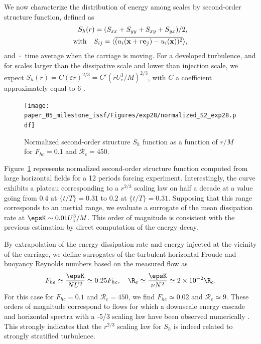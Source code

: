 \noindent We now characterize the distribution of energy among scales by second-order
structure function, defined as
\begin{eqnarray}
S_h(r) = (S_{xx} + S_{yy} + S_{xy} + S_{yx})/2,\\
\text{with} \quad S_{ij} = \langle\overline{(u_i({\bf x}+r{\bf e}_j)-u_i({\bf x}))^2}\rangle,
\end{eqnarray}
and $\overline{\cdot}$ time average when the carriage is moving. For a
developed turbulence, and for scales larger than the dissipative scale and
lower than injection scale, we expect
$S_h(r) = C (\varepsilon r)^{2/3} = C' (rU_c^3/M)^{2/3}$, with $C$ a coefficient
approximately equal to 6 \citep[see figure 15 in][]{AugierBillantChomaz2015}.
\begin{figure}[htb]
\centerline{
\texttt{[image: paper\_05\_milestone\_issf/Figures/exp28/normalized\_S2\_exp28.pdf]}}
\vspace{-2mm}
\caption{Normalized second-order structure $S_h$ function as a function of
$r/M$ for $F_{hc} = 0.1$ and $\mathcal{R}_c=450$.}
\label{fig:S2}
\end{figure}
Figure~\ref{fig:S2} represents normalized second-order structure function
computed from large horizontal fields for a 12 periods forcing
experiment. Interestingly, the curve exhibits a plateau corresponding to a
$r^{2/3}$ scaling law on half a decade at a value going from $0.4$ at
$\{t/T\} = 0.31$ to $0.2$ at $\{t/T\} = 0.31$. Supposing that this range
corresponds to an inertial range, we evaluate a surrogate of the mean
dissipation rate at $\epsK \sim 0.01 U_c^3/M$. This order of magnitude is
consistent with the previous estimation by direct computation of the energy
decay.

\noindent By extrapolation of the energy dissipation rate and energy injected
at the vicinity of the carriage, we define surrogates of the turbulent
horizontal Froude and buoyancy Reynolds numbers based on the measured flow as
\begin{equation}
F_{he} \simeq \frac{\epsK}{N U^2} \simeq 0.25 F_{hc},\quad 
\R_e \simeq \frac{\epsK}{\nu N^2} \simeq 2\times10^{-2} \R_c.
\label{eq:e}
\end{equation}
For this case for $F_{hc} = 0.1$ and $\mathcal{R}_c=450$, we find
$F_{he} \simeq 0.02$ and $\mathcal{R}_e \simeq 9$. These orders of magnitude
correspond to flows for which a downscale energy cascade and horizontal spectra
with a -5/3 scaling law have been observed numerically
\citep[]{BrethouwerBillantLindborg2007, AugierBillantChomaz2015}.
%
This strongly indicates that the $r^{2/3}$ scaling law for $S_h$ is indeed
related to strongly stratified turbulence.


